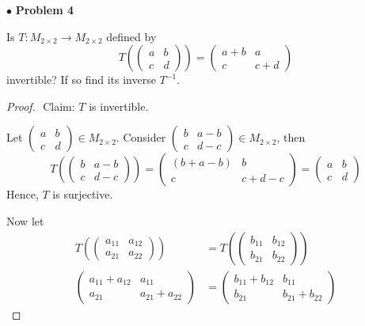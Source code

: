 \documentclass{article}
\begin{document}
\newpage
$ \bullet$ \textbf{Problem 4}
\medskip

\begin{itshape}
Is $T: M_{2 \times 2} \to M_{2 \times 2}$ defined by $$T(\begin{pmatrix} a & b \\ c & d \end{pmatrix}) = \begin{pmatrix} a+b & a \\ c & c+d \end{pmatrix}$$ invertible? If so find its inverse $T^{-1}$.
\end{itshape}
\medskip

\begin{proof}
$ $\newline
Claim: $T$ is invertible.

Let $\begin{pmatrix} a & b \\ c & d \end{pmatrix} \in M_{2 \times 2}$. Consider $\begin{pmatrix} b & a-b \\ c & d-c \end{pmatrix} \in M_{2 \times 2}$, then $$T(\begin{pmatrix} b & a-b \\ c & d-c \end{pmatrix}) = \begin{pmatrix} (b+a-b) & b \\ c & c+d-c \end{pmatrix} = \begin{pmatrix} a & b \\ c & d \end{pmatrix}$$ Hence, $T$ is surjective.

Now let
\begin{align*}
T(\begin{pmatrix} a_{11} & a_{12} \\ a_{21} & a_{22} \end{pmatrix}) &=T( \begin{pmatrix} b_{11} & b_{12} \\ b_{21} & b_{22} \end{pmatrix}) \\
\begin{pmatrix} a_{11}+a_{12} & a_{11} \\ a_{21} & a_{21} + a_{22} \end{pmatrix} &= \begin{pmatrix} b_{11}+b_{12} & b_{11} \\ b_{21} & b_{21} + b_{22} \end{pmatrix}
\end{align*}


\end{proof}
\end{document}

